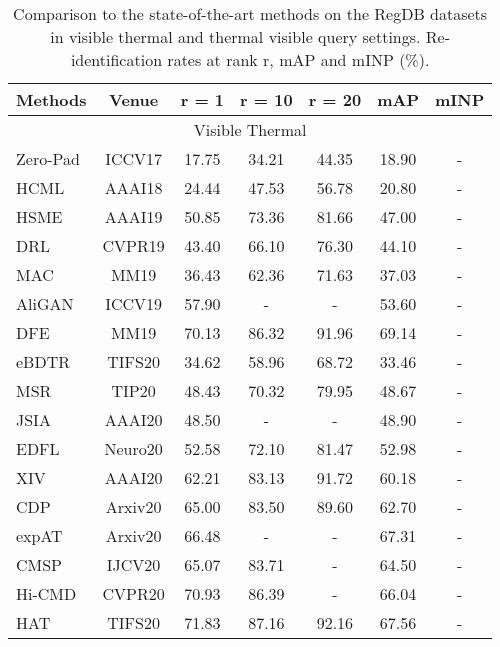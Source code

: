 \documentclass[journal]{IEEEtran}
\begin{document}
\begin{table}
\footnotesize
\caption{Comparison to the state-of-the-art methods on the RegDB datasets in visible  thermal and thermal  visible query settings. Re-identification rates at rank r, mAP and mINP (\%).}
\label{tab:sota_regdb}
  \centering
  \begin{tabular}{l|c|c|c|c|c|c}
    \toprule[2pt]
      Methods & Venue &   r = 1  & r = 10 & r = 20 & mAP & mINP    \\ \toprule[1pt]
      \multicolumn{7}{c}{Visible  Thermal} \\ \toprule[1pt]
      Zero-Pad \cite{wu2017rgb}& ICCV17 &  17.75 & 34.21 & 44.35 & 18.90 & -  \\
      HCML \cite{ye2018hierarchical} & AAAI18 & 24.44 & 47.53 & 56.78& 20.80 & -  \\ \hline
      HSME \cite{hao2019hsme} & AAAI19  & 50.85 & 73.36 & 81.66 & 47.00 & -  \\
      DRL \cite{wang2019learning1}& CVPR19  & 43.40 &66.10 &76.30 &44.10 & -  \\
      MAC \cite{Ye2019ModalityawareCL} & MM19 & 36.43 & 62.36 & 71.63 & 37.03 & -  \\
      AliGAN \cite{wang2019rgb} & ICCV19 & 57.90 & - & - & 53.60 & -  \\
      DFE \cite{Hao2019DualalignmentFE} &  MM19 & 70.13 & 86.32 & 91.96 & 69.14 & -  \\ \hline
      eBDTR \cite{Ye2020DeepLF} & TIFS20 & 34.62 & 58.96 & 68.72 & 33.46 &-  \\
      MSR \cite{Feng2020LearningMR} & TIP20 & 48.43 & 70.32 & 79.95 & 48.67 &-  \\
      JSIA \cite{Wang2020CrossModalityPG} & AAAI20 & 48.50 & - & - & 48.90 &-  \\
      EDFL \cite{liu2020enhancing} & Neuro20 & 52.58 & 72.10 & 81.47 & 52.98 & -  \\
      XIV \cite{Li2020InfraredVisibleCP} & AAAI20 & 62.21 & 83.13 & 91.72 & 60.18 &-  \\
      CDP \cite{Fan2020CrossSpectrumDP} & Arxiv20 & 65.00 & 83.50 & 89.60 & 62.70 &-  \\
      expAT \cite{Ye2020BidirectionalEA} & Arxiv20 & 66.48 & - & - & 67.31 &-  \\
      CMSP \cite{wu2020rgb} & IJCV20 & 65.07 & 83.71 & - & 64.50 &-  \\
      Hi-CMD \cite{choi2020hi} & CVPR20 & 70.93 & 86.39 & - & 66.04 & -   \\
      HAT \cite{ye2018vipr} & TIFS20 & 71.83 & 87.16 & 92.16 & 67.56 & - \\

\end{tabular}
\end{table}
\end{document}
